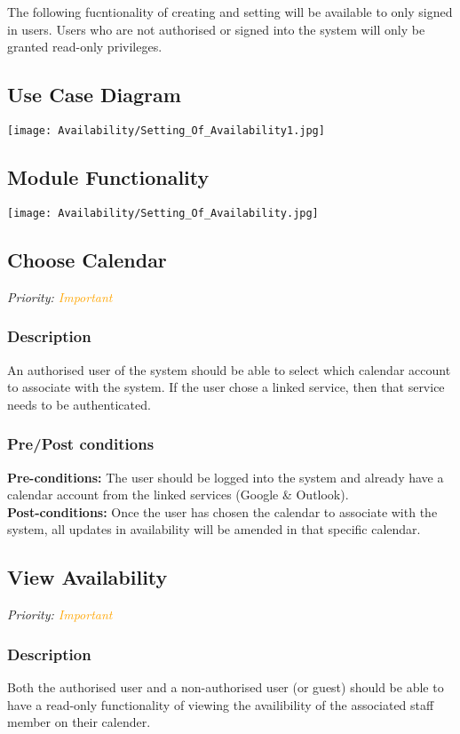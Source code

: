 The following fucntionality of creating and setting will be available to only signed in users. Users who are not authorised or signed into the system will only be granted read-only privileges.
\subsection{Use Case Diagram}
\texttt{[image: Availability/Setting\_Of\_Availability1.jpg]}

\subsection{Module Functionality}
\texttt{[image: Availability/Setting\_Of\_Availability.jpg]}


\subsection{Choose Calendar}
\textit{Priority: \textcolor{orange}{Important}}
	\subsubsection{Description}
	An authorised user of the system should be able to select which calendar account to associate with the system. If the user chose a linked service, then that service needs to be authenticated.\\
	\subsubsection{Pre/Post conditions}
		\textbf{Pre-conditions:} The user should be logged into the system and already have a calendar account from the linked services (Google \& Outlook). \\
		\textbf{Post-conditions:} Once the user has chosen the calendar to associate with the system, all updates in availability will be amended in that specific calendar.

\subsection{View Availability}
\textit{Priority: \textcolor{orange}{Important}}
	\subsubsection{Description}
	Both the authorised user and a non-authorised user (or guest) should be able to have a read-only functionality of viewing the availibility of the associated staff member on their calender.\\
